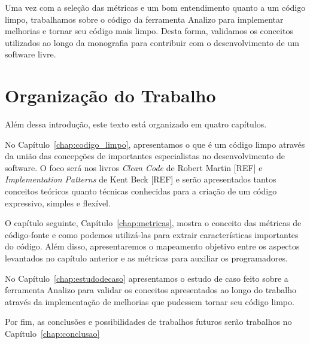 Uma vez com a seleção das métricas e um bom entendimento quanto a um código limpo, trabalhamos sobre o código da ferramenta Analizo para implementar melhorias e tornar seu código mais limpo. Desta forma, validamos os conceitos utilizados ao longo da monografia para contribuir com o desenvolvimento de um software livre.

\section{Organização do Trabalho}
\label{sec:organizacao_trabalho}

Além dessa introdução, este texto está organizado em quatro capítulos.

No Capítulo~\ref{chap:codigo_limpo}, apresentamos o que é um código limpo através
da união das concepções de importantes especialistas no desenvolvimento de software.
O foco será nos livros \textit{Clean Code} de Robert Martin [REF] e \textit{Implementation
Patterns} de Kent Beck [REF] e serão apresentados tantos conceitos teóricos
quanto técnicas conhecidas para a criação de um código expressivo, simples e flexível.

O capítulo seguinte, Capítulo~\ref{chap:metricas}, mostra o conceito das métricas de 
código-fonte e como podemos utilizá-las para extrair características importantes do
código. Além disso, apresentaremos o mapeamento objetivo entre os aspectos levantados
no capítulo anterior e as métricas para auxiliar os programadores.

No Capítulo~\ref{chap:estudodecaso} apresentamos o estudo de caso feito sobre a ferramenta Analizo para 
validar os conceitos apresentados ao longo do trabalho através da implementação de melhorias que pudessem 
tornar seu código limpo.

Por fim, as conclusões e possibilidades de trabalhos futuros serão trabalhos no Capítulo~\ref{chap:conclusao}